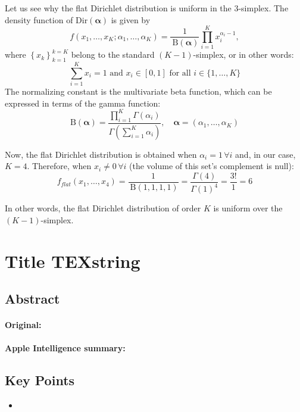 \documentclass[a4paper,12pt]{article}
\begin{document}
\begin{itemize}
    Let us see why the flat Dirichlet distribution is uniform in the 3-simplex. The density function of Dir$(\boldsymbol{\alpha})$ is given by
    $$
    f\left(x_1, \ldots, x_K ; \alpha_1, \ldots, \alpha_K\right)=\frac{1}{\mathrm{~B}(\boldsymbol{\alpha})} \prod_{i=1}^K x_i^{\alpha_i-1},
    $$
    where $\left\{x_k\right\}_{k=1}^{k=K}$ belong to the standard $(K-1)$-simplex, or in other words:
    $$
    \sum_{i=1}^K x_i=1 \text { and } x_i \in[0,1] \text { for all } i \in\{1, \ldots, K\}
    $$
    The normalizing constant is the multivariate beta function, which can be expressed in terms of the gamma function:
    $$
    \mathrm{B}(\boldsymbol{\alpha})=\frac{\prod_{i=1}^K \Gamma\left(\alpha_i\right)}{\Gamma\left(\sum_{i=1}^K \alpha_i\right)}, \quad \boldsymbol{\alpha}=\left(\alpha_1, \ldots, \alpha_K\right)
    $$

    Now, the flat Dirichlet distribution is obtained when $\alpha_i=1 \, \forall i$ and, in our case, $K=4$. Therefore, when $x_i \neq 0 \, \forall i$ (the volume of this set's complement is null):
    $$
    f_{flat}\left(x_1, \ldots, x_4\right) = \frac{1}{\mathrm{~B}(1,1,1,1)} = \frac{\Gamma \left(4\right)}{\Gamma(1)^4} = \frac{3!}{1} = 6
    $$

    In other words, the flat Dirichlet distribution of order $K$ is uniform over the $(K-1)$-simplex.

\end{itemize}

\pagebreak
\section{Title \texorpdfstring{TEXstring}{TEXstring}}
\label{sec:}

\subsection{Abstract}

\paragraph{Original:}

\paragraph{Apple Intelligence summary:}


\subsection{Key Points}

\begin{itemize}
    \item 
\end{itemize}


\pagebreak
\printbibliography
\end{document}
